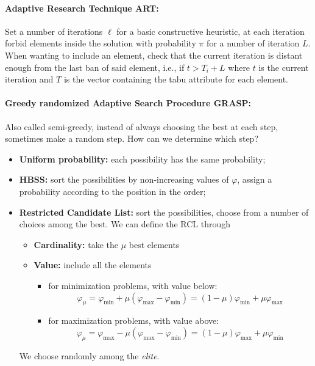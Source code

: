 \documentclass{article}
\begin{document}
	\paragraph{Adaptive Research Technique ART:} Set a number of iterations $\ell$ for a basic constructive heuristic, at each iteration forbid elements inside the solution with probability $\pi$ for a number of iteration $L$. When wanting to include an element, check that the current iteration is distant enough from the last ban of said element, i.e., if $t > T_i + L$ where $t$ is the current iteration and $T$ is the vector containing the tabu attribute for each element.\\
	
	\paragraph{Greedy randomized Adaptive Search Procedure GRASP:} Also called semi-greedy, instead of always choosing the best at each step, sometimes make a random step. How can we determine which step? 
	\begin{itemize}
		\item \textbf{Uniform probability:} each possibility has the same probability;
		\item \textbf{HBSS:} sort the possibilities by non-increasing values of $\varphi$, assign a probability according to the position in the order;
		\item \textbf{Restricted Candidate List:} sort the possibilities, choose from a number of choices among the best. We can define the RCL through 
		\begin{itemize}
			\item \textbf{Cardinality:} take the $\mu$ best elements
			\item \textbf{Value:} include all the elements 
			\begin{itemize}
				\item for minimization problems, with value below:
				$$ \varphi_\mu = \varphi_{\min} + \mu(\varphi_{\max} - \varphi_{\min}) = (1 - \mu) \varphi_{\min} + \mu \varphi_{\max} $$
				\item for maximization problems, with value above:
				$$ \varphi_\mu = \varphi_{\max} - \mu (\varphi_{\max} - \varphi_{\min}) = (1 - \mu) \varphi_{\max} + \mu \varphi_{\min} $$
			\end{itemize}
		\end{itemize}
		We choose randomly among the \textit{elite}.\\
	\end{itemize}
	
\end{document}
